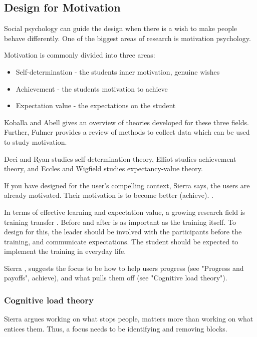 \subsection{Design for Motivation}

Social psychology can guide the design when there is a wish to make people behave differently. One of the biggest areas of research is motivation psychology.

Motivation is commonly divided into three areas:
\begin{itemize}
\item Self-determination - the students inner motivation, genuine wishes
\item Achievement - the students motivation to achieve
\item Expectation value - the expectations on the student
\end{itemize}

Koballa \citep{koballa} and Abell \citep{abell} gives an overview of theories developed for these three fields. Further, Fulmer \citep{fulmer} provides a review of methods to collect data which can be used to study motivation.

Deci \citep{deci} and Ryan \citep{ryan} studies self-determination theory, Elliot \citep{elliot} studies achievement theory, and Eccles \citep{eccles} and Wigfield \citep{wigfield} studies expectancy-value theory.

If you have designed for the user's compelling context, Sierra says, the users are already motivated. Their motivation is to become better (achieve). \citep{sierra}.

In terms of effective learning and expectation value, a growing research field is training transfer \citep{brinkerhoff}. Before and after is as important as the training itself. To design for this, the leader should be involved with the participants before the training, and communicate expectations. The student should be expected to implement the training in everyday life. \citep{brinkerhoff}

Sierra \citep{sierra}, suggests the focus to be how to help users progress (see "Progress and payoffs", achieve), and what pulls them off (see "Cognitive load theory").

\subsubsection{Cognitive load theory}

Sierra argues working on what stops people, matters more than working on what entices them. Thus, a focus needs to be identifying and removing blocks.

